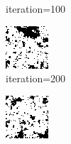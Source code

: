 \documentclass{article}
\begin{document}
\begin{figure}[h]
\begin{subfigure}[t]{0.18\textwidth}
\vspace{-0.6cm}
\caption{iteration=100}
\end{subfigure}\hspace{0.01\textwidth}
\begin{subfigure}[t]{0.18\textwidth}
\centering
\includegraphics[width=\textwidth]{./computational/results/gibbs_comb_sampler_positive_iter_200.png}
\vspace{-0.6cm}
\caption{iteration=200}
\end{subfigure}\hspace{0.01\textwidth}
\begin{subfigure}[t]{0.18\textwidth}
\centering
\includegraphics[width=\textwidth]{./computational/results/gibbs_comb_sampler_positive_iter_300.png}

\end{subfigure}
\end{figure}
\end{document}
